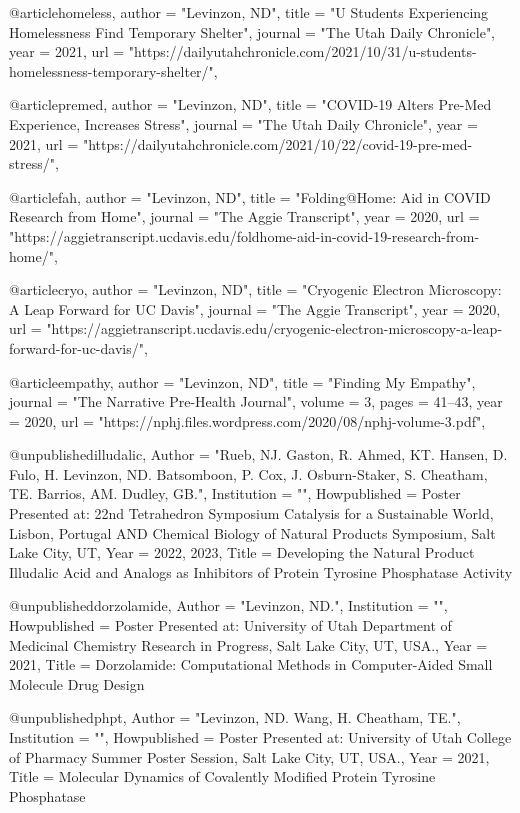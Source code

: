 @article{homeless,
    author = "{Levinzon, ND}",
    title = "U Students Experiencing Homelessness Find Temporary Shelter",
    journal = "The Utah Daily Chronicle",
    year = {2021},
    url = "https://dailyutahchronicle.com/2021/10/31/u-students-homelessness-temporary-shelter/",
}

@article{premed,
    author = "{Levinzon, ND}",
    title = "COVID-19 Alters Pre-Med Experience, Increases Stress",
    journal = "The Utah Daily Chronicle",
    year = {2021},
    url = "https://dailyutahchronicle.com/2021/10/22/covid-19-pre-med-stress/",
}

@article{fah,
    author = "{Levinzon, ND}",
    title = "Folding@Home: Aid in COVID Research from Home",
    journal = "The Aggie Transcript",
    year = {2020},
    url = "https://aggietranscript.ucdavis.edu/foldhome-aid-in-covid-19-research-from-home/",
}

@article{cryo,
    author = "{Levinzon, ND}",
    title = "Cryogenic Electron Microscopy: A Leap Forward for UC Davis",
    journal = "The Aggie Transcript",
    year = {2020},
    url = "https://aggietranscript.ucdavis.edu/cryogenic-electron-microscopy-a-leap-forward-for-uc-davis/",
}

@article{empathy,
    author = "{Levinzon, ND}",
    title = "Finding My Empathy",
    journal = "The Narrative Pre-Health Journal",
    volume = {3},
    pages = {41--43},
    year = {2020},
    url = "https://nphj.files.wordpress.com/2020/08/nphj-volume-3.pdf",
}

@unpublished{illudalic,
  Author = "{Rueb, NJ. Gaston, R. Ahmed, KT. Hansen, D. Fulo, H. Levinzon, ND. Batsomboon, P. Cox, J. Osburn-Staker, S. Cheatham, TE. Barrios, AM. Dudley, GB.}",
  Institution = "{}",
  Howpublished = {Poster Presented at: 22nd Tetrahedron Symposium Catalysis for a Sustainable World, Lisbon, Portugal AND Chemical Biology of Natural Products Symposium, Salt Lake City, UT},
  Year = {2022, 2023},
  Title = {Developing the Natural Product Illudalic Acid and Analogs as Inhibitors of Protein Tyrosine Phosphatase Activity}
}

@unpublished{dorzolamide,
  Author = "{Levinzon, ND.}",
  Institution = "{}",
  Howpublished = {Poster Presented at: University of Utah Department of Medicinal Chemistry Research in Progress, Salt Lake City, UT, USA.},
  Year = {2021},
  Title = {Dorzolamide: Computational Methods in Computer-Aided Small Molecule Drug Design}
}

@unpublished{phpt,
  Author = "{Levinzon, ND. Wang, H. Cheatham, TE.}",
  Institution = "{}",
  Howpublished = {Poster Presented at: University of Utah College of Pharmacy Summer Poster Session, Salt Lake City, UT, USA.},
  Year = {2021},
  Title = {Molecular Dynamics of Covalently Modified Protein Tyrosine Phosphatase}
}

